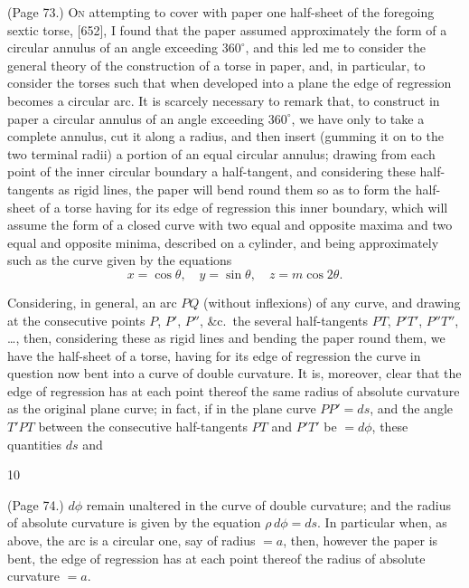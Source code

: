\documentclass[11pt,a4paper]{article}
\begin{document}
\medskip

\noindent (Page 73.) \textsc{On} attempting to cover with paper one half-sheet of the foregoing sextic torse, [652], I found that the paper assumed approximately the form of a circular annulus of an angle exceeding $360^\circ$, and this led me to consider the general theory of the construction of a torse in paper, and, in particular, to consider the torses such that when developed into a plane the edge of regression becomes a circular arc. It is scarcely necessary to remark that, to construct in paper a circular annulus of an angle exceeding $360^\circ$, we have only to take a complete annulus, cut it along a radius, and then insert (gumming it on to the two terminal radii) a portion of an equal circular annulus; drawing from each point of the inner circular boundary a half-tangent, and considering these half-tangents as rigid lines, the paper will bend round them so as to form the half-sheet of a torse having for its edge of regression this inner boundary, which will assume the form of a closed curve with two equal and opposite maxima and two equal and opposite minima, described on a cylinder, and being approximately such as the curve given by the equations
\[
x = \cos\theta,\quad y = \sin\theta,\quad z = m \cos 2\theta.
\]

Considering, in general, an arc $PQ$ (without inflexions) of any curve, and drawing at the consecutive points $P$, $P'$, $P''$, \&c.\ the several half-tangents $PT$, $P'T'$, $P''T''$, \ldots, then, considering these as rigid lines and bending the paper round them, we have the half-sheet of a torse, having for its edge of regression the curve in question now bent into a curve of double curvature. It is, moreover, clear that the edge of regression has at each point thereof the same radius of absolute curvature as the original plane curve; in fact, if in the plane curve $PP' = ds$, and the angle $T'PT$ between the consecutive half-tangents $PT$ and $P'T'$ be $= d\phi$, these quantities $ds$ and

\hfill 10

\bigskip

\noindent (Page 74.) $d\phi$ remain unaltered in the curve of double curvature; and the radius of absolute curvature is given by the equation $\rho\, d\phi = ds$. In particular when, as above, the arc is a circular one, say of radius $= a$, then, however the paper is bent, the edge of regression has at each point thereof the radius of absolute curvature $= a$.
\end{document}
